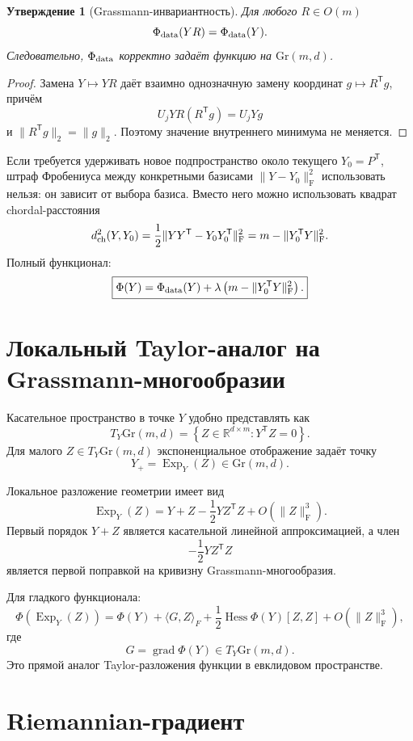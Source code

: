 \documentclass[11pt,a4paper]{article}
\newcommand{\R}{\mathbb R}
\newcommand{\T}{^{\mathsf T}}
\newcommand{\F}{_{\mathrm F}}
\newcommand{\Gr}{\mathrm{Gr}}
\newcommand{\Exp}{\operatorname{Exp}}
\newcommand{\grad}{\operatorname{grad}}
\newtheorem{proposition}{Утверждение}
\begin{document}
\begin{proposition}[Grassmann-инвариантность]
Для любого \(R\in O(m)\)
\[
    \Phi_{\rm data}(YR)=\Phi_{\rm data}(Y).
\]
Следовательно, \(\Phi_{\rm data}\) корректно задаёт функцию на
\(\Gr(m,d)\).
\end{proposition}

\begin{proof}
Замена \(Y\mapsto YR\) даёт взаимно однозначную замену координат
\(g\mapsto R\T g\), причём
\[
    U_jYR(R\T g)=U_jYg
\]
и \(\|R\T g\|_2=\|g\|_2\). Поэтому значение внутреннего минимума
не меняется.
\end{proof}

Если требуется удерживать новое подпространство около текущего
\(Y_0=P\T\), штраф Фробениуса между конкретными базисами
\(\|Y-Y_0\|\F^2\) использовать нельзя: он зависит от выбора базиса.
Вместо него можно использовать квадрат chordal-расстояния
\[
    d_{\rm ch}^2(Y,Y_0)
    =
    \frac12
    \|YY\T-Y_0Y_0\T\|\F^2
    =
    m-\|Y_0\T Y\|\F^2.
\]
Полный функционал:
\[
    \boxed{
    \Phi(Y)
    =
    \Phi_{\rm data}(Y)
    +
    \lambda
    \left(
        m-\|Y_0\T Y\|\F^2
    \right).
    }
\]

\section{Локальный Taylor-аналог на Grassmann-многообразии}

Касательное пространство в точке \(Y\) удобно представлять как
\[
    T_Y\Gr(m,d)
    =
    \left\{
        Z\in\R^{d\times m}:
        Y\T Z=0
    \right\}.
\]
Для малого \(Z\in T_Y\Gr(m,d)\) экспоненциальное отображение задаёт
точку
\[
    Y_+=\Exp_Y(Z)\in\Gr(m,d).
\]

Локальное разложение геометрии имеет вид
\[
    \boxed{
    \Exp_Y(Z)
    =
    Y+Z-\frac12YZ\T Z
    +O(\|Z\|\F^3).
    }
\]
Первый порядок \(Y+Z\) является касательной линейной аппроксимацией,
а член
\[
    -\frac12YZ\T Z
\]
является первой поправкой на кривизну Grassmann-многообразия.

Для гладкого функционала:
\[
    \Phi(\Exp_Y(Z))
    =
    \Phi(Y)
    +
    \langle G,Z\rangle_F
    +
    \frac12
    \operatorname{Hess}\Phi(Y)[Z,Z]
    +
    O(\|Z\|\F^3),
\]
где
\[
    G=\grad\Phi(Y)\in T_Y\Gr(m,d).
\]
Это прямой аналог Taylor-разложения функции в евклидовом пространстве.

\section{Riemannian-градиент}
\end{document}
